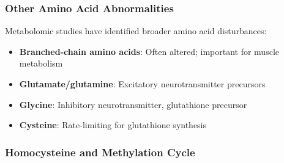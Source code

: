 \subsubsection{Other Amino Acid Abnormalities}

Metabolomic studies have identified broader amino acid disturbances:

\begin{itemize}
    \item \textbf{Branched-chain amino acids}: Often altered; important for muscle metabolism
    \item \textbf{Glutamate/glutamine}: Excitatory neurotransmitter precursors
    \item \textbf{Glycine}: Inhibitory neurotransmitter, glutathione precursor
    \item \textbf{Cysteine}: Rate-limiting for glutathione synthesis
\end{itemize}

\subsubsection{Homocysteine and Methylation Cycle}

